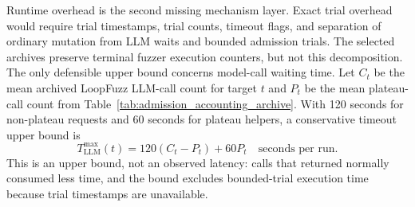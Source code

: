 \documentclass[final,5p,times,number]{elsarticle}
\begin{document}
\begin{table}[!t]
\centering
\caption{Candidate-level admission-accounting gaps}
\label{tab:candidate_admission_gap}
{\scriptsize
\setlength{\tabcolsep}{3.2pt}
\renewcommand{\arraystretch}{1.04}
}
\end{table}

Runtime overhead is the second missing mechanism layer. Exact trial overhead would require trial timestamps, trial counts, timeout flags, and separation of ordinary mutation from LLM waits and bounded admission trials. The selected archives preserve terminal fuzzer execution counters, but not this decomposition. The only defensible upper bound concerns model-call waiting time. Let $C_t$ be the mean archived LoopFuzz LLM-call count for target $t$ and $P_t$ be the mean plateau-call count from Table~\ref{tab:admission_accounting_archive}. With 120 seconds for non-plateau requests and 60 seconds for plateau helpers, a conservative timeout upper bound is
\[
T^{\max}_{\mathrm{LLM}}(t) = 120(C_t-P_t)+60P_t \quad \text{seconds per run}.
\]
This is an upper bound, not an observed latency: calls that returned normally consumed less time, and the bound excludes bounded-trial execution time because trial timestamps are unavailable.
\end{document}
